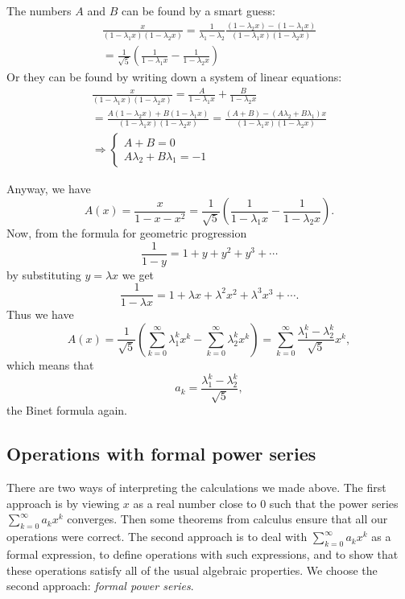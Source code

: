 \begin{page}
The numbers $A$ and $B$ can be found by a smart guess:
\begin{multline*}
\frac{x}{(1-\lambda_1x)(1-\lambda_2x)} =
\frac{1}{\lambda_1 - \lambda_2} \frac{(1-\lambda_2x) - (1-\lambda_1x)}{(1-\lambda_1x)(1-\lambda_2x)}\\
= \frac{1}{\sqrt{5}} \left( \frac{1}{1-\lambda_1x} - \frac{1}{1-\lambda_2x} \right)
\end{multline*}
Or they can be found by writing down a system of linear equations:
\begin{multline*}
\frac{x}{(1-\lambda_1x)(1-\lambda_2x)} = \frac{A}{1-\lambda_1x} + \frac{B}{1-\lambda_2x}\\
= \frac{A(1-\lambda_2x) + B(1-\lambda_1x)}{(1-\lambda_1x)(1-\lambda_2x)}
= \frac{(A+B) - (A\lambda_2 + B\lambda_1)x}{(1-\lambda_1x)(1-\lambda_2x)}\\
\Rightarrow \begin{cases} A+B = 0\\ A\lambda_2 + B\lambda_1 = -1 \end{cases}
\end{multline*}

Anyway, we have
\[
A(x) = \frac{x}{1-x-x^2} = \frac{1}{\sqrt{5}} \left( \frac{1}{1-\lambda_1x} - \frac{1}{1-\lambda_2x} \right).
\]
Now, from the formula for geometric progression
\[
\frac{1}{1-y} = 1 + y + y^2 + y^3 + \cdots
\]
by substituting $y = \lambda x$ we get
\[
\frac{1}{1 - \lambda x} = 1 + \lambda x + \lambda^2 x^2 + \lambda^3 x^3 + \cdots.
\]
Thus we have
\[
A(x) = \frac{1}{\sqrt{5}} \left( \sum_{k=0}^\infty \lambda_1^kx^k - \sum_{k=0}^\infty \lambda_2^kx^k \right)
= \sum_{k=0}^\infty \frac{\lambda_1^k - \lambda_2^k}{\sqrt{5}} x^k,
\]
which means that
\[
a_k = \frac{\lambda_1^k - \lambda_2^k}{\sqrt{5}},
\]
the Binet formula again.



\end{page}

\begin{page}
\setcounter{section}{2}
\setcounter{subsection}{2}
\setcounter{dfn}{0}
\label{portion:820}

\subsection{Operations with formal power series}
\label{sec:OperFPS}
There are two ways of interpreting the calculations we made above.
The first approach is by viewing $x$ as a real number close to $0$ such that the power series $\sum_{k=0}^\infty a_k x^k$ converges.
Then some theorems from calculus ensure that all our operations were correct.
The second approach is to deal with $\sum_{k=0}^\infty a_k x^k$ as a formal expression,
to define operations with such expressions, and to show that these operations satisfy all of the usual algebraic properties.
We choose the second approach: \emph{formal power series}.


\end{page}

